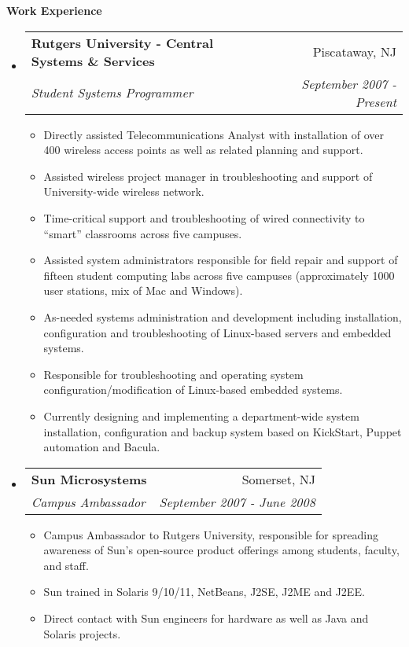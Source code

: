 \documentclass[letterpaper,11pt]{article}
\makeatletter
\newcommand{\resitem}[1]{\item #1 \vspace{-2pt}}
\newcommand{\resheading}[1]{{\large \colorbox{mygrey}{\begin{minipage}{\textwidth}{\textbf{#1 \vphantom{p\^{E}}}}\end{minipage}}}}
\newcommand{\ressubheading}[4]{
\begin{tabular*}{7.0in}{l@{\extracolsep{\fill}}r}
		\textbf{#1} & #2 \\
		\textit{#3} & \textit{#4} \\
\end{tabular*}\vspace{-6pt}}
\makeatother
\begin{document}
\resheading{Work Experience}
\begin{itemize}
\item
	\ressubheading{Rutgers University - Central Systems \& Services}{Piscataway, NJ}{Student Systems Programmer}{September 2007 - Present}
	\begin{itemize}
                \resitem{Directly assisted Telecommunications Analyst with
                  installation of over 400 wireless access
                  points as well as related planning and support.}
                \resitem{Assisted wireless project manager in troubleshooting
                  and support of University-wide wireless network.}
                \resitem{Time-critical support and troubleshooting of wired
                  connectivity to ``smart'' classrooms across five campuses.}
                \resitem{Assisted system administrators responsible for field repair and support of fifteen student computing
                  labs across five campuses (approximately 1000 user stations,
                  mix of Mac and Windows).}
                \resitem{As-needed systems administration and development including
                  installation, configuration and troubleshooting of 
                  Linux-based servers and embedded systems.}
                \resitem{Responsible for troubleshooting and operating system
                  configuration/modification of Linux-based embedded systems.}
                \resitem{Currently designing and implementing a department-wide system
                  installation, configuration and backup system based on
                  KickStart, Puppet automation and Bacula.}
	\end{itemize}

\item
        \ressubheading{Sun Microsystems}{Somerset, NJ}{Campus Ambassador}{September 2007 - June 2008}
        \begin{itemize}
                \resitem{Campus Ambassador to Rutgers University, responsible
                  for spreading awareness of Sun's open-source product
                  offerings among students, faculty, and staff.}
                \resitem{Sun trained in Solaris 9/10/11,
                  NetBeans, J2SE, J2ME and J2EE. }
                \resitem{Direct contact with Sun engineers for hardware as
                  well as Java and Solaris projects.}
        \end{itemize}


\end{itemize}
\end{document}
